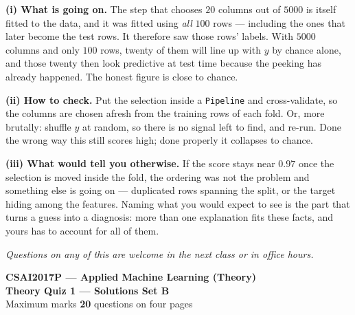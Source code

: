 \documentclass[10pt,a4paper]{article}
\newcommand{\SetLetter}{}
\begin{document}
\vspace{4pt}

\textbf{(i) What is going on.} The step that chooses $20$ columns out of $5000$ is itself fitted to the data, and it was fitted using \emph{all} $100$ rows --- including the ones that later become the test rows. It therefore saw those rows' labels. With $5000$ columns and only $100$ rows, twenty of them will line up with $y$ by chance alone, and those twenty then look predictive at test time because the peeking has already happened. The honest figure is close to chance.\par\vspace{1mm}\textbf{(ii) How to check.} Put the selection inside a \texttt{Pipeline} and cross-validate, so the columns are chosen afresh from the training rows of each fold. Or, more brutally: shuffle $y$ at random, so there is no signal left to find, and re-run. Done the wrong way this still scores high; done properly it collapses to chance.\par\vspace{1mm}\textbf{(iii) What would tell you otherwise.} If the score stays near $0.97$ once the selection is moved inside the fold, the ordering was not the problem and something else is going on --- duplicated rows spanning the split, or the target hiding among the features. Naming what you would expect to see is the part that turns a guess into a diagnosis: more than one explanation fits these facts, and yours has to account for all of them.

\vfill

{\footnotesize\itshape Questions on any of this are welcome in the next class or in office hours.}

\newpage


\renewcommand{\SetLetter}{B}\setcounter{page}{1}

\begin{center}
{\large\bfseries CSAI2017P --- Applied Machine Learning (Theory)}\\[2pt]
{\large\bfseries Theory Quiz 1 --- Solutions \quad\textbullet\quad Set B}\\[3pt]
{\small Maximum marks \textbf{20} \quad\textbullet{} questions on four pages}
\end{center}
\vspace{2pt}

\noindent{}
\vspace{3pt}
\end{document}
